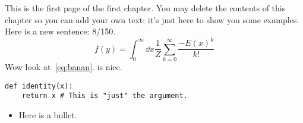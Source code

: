 \documentclass[../notebook.tex]{subfiles}
\begin{document}

This is the first page of the first chapter. You may delete the
contents of this chapter so you can add your own text; it's just here to show
you some examples. Here is a new sentence: 8/150.
\begin{equation}
  f(y)
  = \int_0^\infty \dd{x}\frac{1}{Z}\sum_{k=0}^\infty \frac{-{E(x)}^k}{k!}
  \label{eq:banan}
\end{equation}
Wow look at~\cref{eq:banan}.  is nice.
\begin{verbatim}
def identity(x):
    return x # This is "just" the argument.
\end{verbatim}
\begin{itemize}
  \item Here is a bullet.
\end{itemize}

\lipsum%
\end{document}

